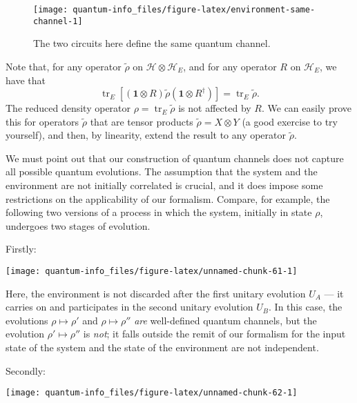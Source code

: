 \documentclass[fleqn]{article}
\begin{document}
\begin{figure}[H]

{\centering \texttt{[image: quantum-info\_files/figure-latex/environment-same-channel-1]} 

}

\caption{The two circuits here define the same quantum channel.}\label{fig:environment-same-channel}
\end{figure}

Note that, for any operator \(\tilde{\rho}\) on \(\mathcal{H}\otimes\mathcal{H}_E\), and for any operator \(R\) on \(\mathcal{H}_E\), we have that
\[
  \operatorname{tr}_E\left[
    (\mathbf{1}\otimes R) \tilde{\rho} (\mathbf{1}\otimes R^\dagger)
  \right] = \operatorname{tr}_E \tilde{\rho}.
\]
The reduced density operator \(\rho=\operatorname{tr}_E\tilde{\rho}\) is not affected by \(R\).
We can easily prove this for operators \(\tilde{\rho}\) that are tensor products \(\tilde{\rho}=X\otimes Y\) (a good exercise to try yourself), and then, by linearity, extend the result to any operator \(\tilde{\rho}\).

We must point out that our construction of quantum channels does not capture all possible quantum evolutions.
The assumption that the system and the environment are not initially correlated is crucial, and it does impose some restrictions on the applicability of our formalism.
Compare, for example, the following two versions of a process in which the system, initially in state \(\rho\), undergoes two stages of evolution.

Firstly:

\begin{center}\texttt{[image: quantum-info\_files/figure-latex/unnamed-chunk-61-1]} \end{center}

Here, the environment is not discarded after the first unitary evolution \(U_A\) --- it carries on and participates in the second unitary evolution \(U_B\).
In this case, the evolutions \(\rho\mapsto\rho'\) and \(\rho\mapsto\rho''\) \emph{are} well-defined quantum channels, but the evolution \(\rho'\mapsto\rho''\) is \emph{not}; it falls outside the remit of our formalism for the input state of the system and the state of the environment are not independent.

Secondly:

\begin{center}\texttt{[image: quantum-info\_files/figure-latex/unnamed-chunk-62-1]} \end{center}
\end{document}
